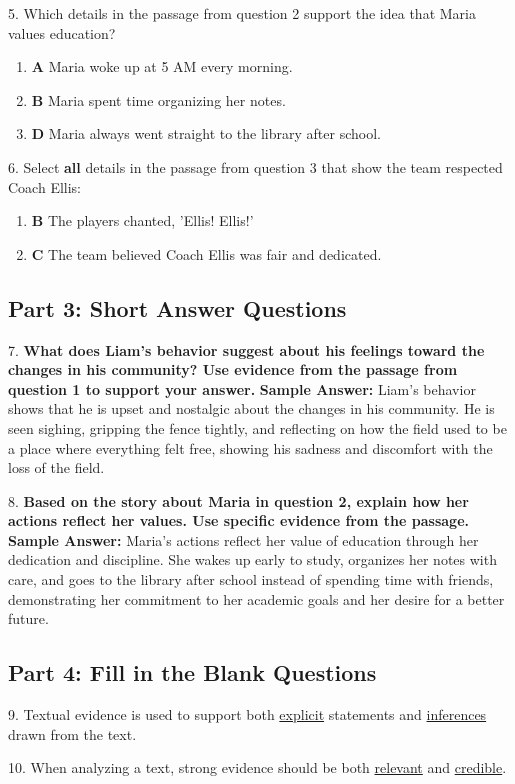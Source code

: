 \documentclass[12pt]{article}
\begin{document}
5. Which details in the passage from question 2 support the idea that Maria values education?
\begin{enumerate}[label=\Alph*.]
    \item \textbf{A} Maria woke up at 5 AM every morning.
    \item \textbf{B} Maria spent time organizing her notes.
    \item \textbf{D} Maria always went straight to the library after school.
\end{enumerate}

6. Select \textbf{all} details in the passage from question 3 that show the team respected Coach Ellis:
\begin{enumerate}[label=\Alph*.]
    \item \textbf{B} The players chanted, 'Ellis! Ellis!'
    \item \textbf{C} The team believed Coach Ellis was fair and dedicated.
\end{enumerate}

\subsection*{Part 3: Short Answer Questions}

7. \textbf{What does Liam’s behavior suggest about his feelings toward the changes in his community? Use evidence from the passage from question 1 to support your answer.}
\textbf{Sample Answer:} Liam's behavior shows that he is upset and nostalgic about the changes in his community. He is seen sighing, gripping the fence tightly, and reflecting on how the field used to be a place where everything felt free, showing his sadness and discomfort with the loss of the field.

8. \textbf{Based on the story about Maria in question 2, explain how her actions reflect her values. Use specific evidence from the passage.}
\textbf{Sample Answer:} Maria's actions reflect her value of education through her dedication and discipline. She wakes up early to study, organizes her notes with care, and goes to the library after school instead of spending time with friends, demonstrating her commitment to her academic goals and her desire for a better future.

\subsection*{Part 4: Fill in the Blank Questions}

9. Textual evidence is used to support both \underline{explicit} statements and \underline{inferences} drawn from the text.

10. When analyzing a text, strong evidence should be both \underline{relevant} and \underline{credible}.
\end{document}
